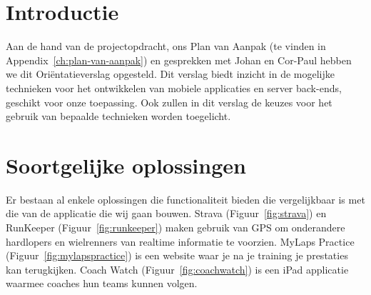 \section{Introductie}

\ifx\aanleiding\undefined

\fi

Aan de hand van de projectopdracht, ons Plan van Aanpak (te vinden in Appendix~\ref{ch:plan-van-aanpak}) en gesprekken met Johan en Cor-Paul hebben we dit Ori\"entatieverslag opgesteld. Dit verslag biedt inzicht in de mogelijke technieken voor het ontwikkelen van mobiele applicaties en server back-ends, geschikt voor onze toepassing. Ook zullen in dit verslag de keuzes voor het gebruik van bepaalde technieken worden toegelicht.

\section{Soortgelijke oplossingen}

Er bestaan al enkele oplossingen die functionaliteit bieden die vergelijkbaar is met die van de applicatie die wij gaan bouwen. Strava (Figuur~\ref{fig:strava}) en RunKeeper (Figuur~\ref{fig:runkeeper}) maken gebruik van GPS om onderandere hardlopers en wielrenners van realtime informatie te voorzien. MyLaps Practice (Figuur~\ref{fig:mylapspractice}) is een website waar je na je training je prestaties kan terugkijken. Coach Watch (Figuur~\ref{fig:coachwatch}) is een iPad applicatie waarmee coaches hun teams kunnen volgen.

